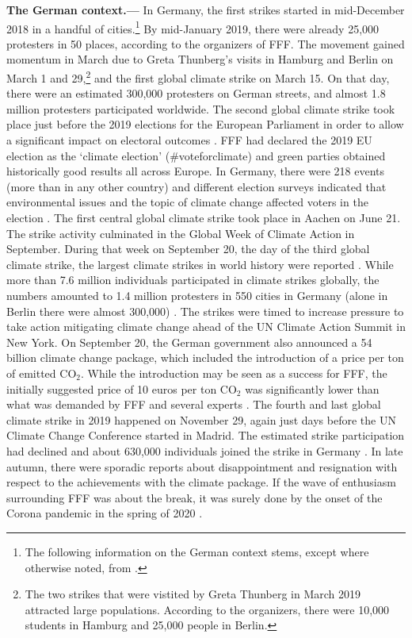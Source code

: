 \textbf{The German context.---} In Germany, the first strikes started in mid-December 2018 in a handful of cities.\footnote{The following information on the German context stems, except where otherwise noted, from \cite{sommer2019fridays}.} By mid-January 2019, there were already 25,000 protesters in 50 places, according to the organizers of FFF. The movement gained momentum in March due to Greta Thunberg's visits in Hamburg and Berlin on March 1 and 29,\footnote{The two strikes that were vistited by Greta Thunberg in March 2019 attracted large populations. According to the organizers, there were 10,000 students in Hamburg and 25,000 people in Berlin.} and the first global climate strike on March 15. On that day, there were an estimated 300,000 protesters on German streets, and almost 1.8 million protesters participated worldwide. The second global climate strike took place just before the 2019 elections for the European Parliament in order to allow a significant impact on electoral outcomes \citep{smith2019window}. FFF had declared the 2019 EU election as the `climate election' (\#voteforclimate) and green parties obtained historically good results all across Europe. In Germany, there were 218 events (more than in any other country) and different election surveys indicated that environmental issues and the topic of climate change affected voters in the election \citep{Time2019may24}. The first central global climate strike took place in Aachen on June 21. The strike activity culminated in the Global Week of Climate Action in September. During that week on September 20, the day of the third global climate strike, the largest climate strikes in world history were reported \citep{guardian2019weekofaction}. While more than 7.6 million individuals participated in climate strikes globally, the numbers amounted to 1.4 million protesters in 550 cities in Germany (alone in Berlin there were almost 300,000) \citep{demoor2020protest}. The strikes were timed to increase pressure to take action mitigating climate change ahead of the UN Climate Action Summit in New York. On September 20, the German government also announced a 54 billion climate change package, which included the introduction of a price per ton of emitted CO$_2$. While the introduction may be seen as a success for FFF, the initially suggested price of 10 euros per ton CO$_2$ was significantly lower than what was demanded by FFF and several experts \citep{economist2019klimapaket}. The fourth and last global climate strike in 2019 happened on November 29, again just days before the UN Climate Change Conference started in Madrid. The estimated strike participation had declined and about 630,000 individuals joined the strike in Germany \citep{zeit20194cgs}. In late autumn, there were sporadic reports about disappointment and resignation with respect to the achievements with the climate package. If the wave of enthusiasm surrounding FFF was about the break, it was surely done by the onset of the Corona pandemic in the spring of 2020 \citep{ZEIT2020}.



